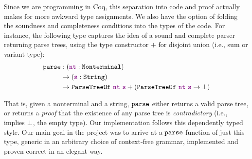     Since we are programming in Coq, this separation into code and proof actually makes for more awkward type assignments.  We also have the option of folding the soundness and completeness conditions into the types of the code.  For instance, the following type captures the idea of a sound and complete parser returning parse trees, using the type constructor $+$ for disjoint union (i.e., sum or variant type):
    \begin{align*}
      \fname{parse} & \oftypesep
      (\oftype{\farg{nt}}{\Nonterminal}) \\
      & \typeto (\oftype{\farg{s}}{\String}) \\
      & \typeto \indname{ParseTreeOf}~\farg{nt}~\farg{s} + (\indname{ParseTreeOf}~\farg{nt}~\farg{s} \typeto \False)
    \end{align*}

    That is, given a nonterminal and a string, $\texttt{parse}$ either returns a valid parse tree, or returns a \emph{proof} that the existence of any parse tree is \emph{contradictory} (i.e., implies $\bot$, the empty type).  Our implementation follows this dependently typed style.  Our main goal in the project was to arrive at a $\texttt{parse}$ function of just this type, generic in an arbitrary choice of context-free grammar, implemented and proven correct in an elegant way.
